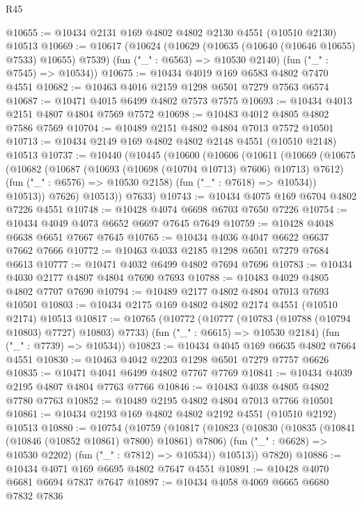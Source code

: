 \begin{lexlean}{R45}
\begin{coremodule}
@10655 := @10434 @2131 @169 @4802 @4802 @2130 @4551 (@10510 @2130) @10513
@10669 := @10617
    (@10624
      (@10629 (@10635 (@10640 (@10646 @10655) @7533) @10655) @7539)
      (fun ("_" : @6563) => @10530 @2140)
      (fun ("_" : @7545) => @10534))
@10675 := @10434 @4019 @169 @6583 @4802 @7470 @4551
@10682 := @10463 @4016 @2159 @1298 @6501 @7279 @7563 @6574
@10687 := @10471 @4015 @6499 @4802 @7573 @7575
@10693 := @10434 @4013 @2151 @4807 @4804 @7569 @7572
@10698 := @10483 @4012 @4805 @4802 @7586 @7569
@10704 := @10489 @2151 @4802 @4804 @7013 @7572 @10501
@10713 := @10434 @2149 @169 @4802 @4802 @2148 @4551 (@10510 @2148) @10513
@10737 := @10440
    (@10445
      (@10600
        (@10606
          (@10611
            (@10669
              (@10675
                (@10682
                  (@10687 (@10693 (@10698 (@10704 @10713) @7606) @10713) @7612)
                  (fun ("_" : @6576) => @10530 @2158)
                  (fun ("_" : @7618) => @10534))
                @10513))
            @7626)
          @10513))
      @7633)
@10743 := @10434 @4075 @169 @6704 @4802 @7226 @4551
@10748 := @10428 @4074 @6698 @6703 @7650 @7226
@10754 := @10434 @4049 @4073 @6652 @6697 @7645 @7649
@10759 := @10428 @4048 @6638 @6651 @7667 @7645
@10765 := @10434 @4036 @4047 @6622 @6637 @7662 @7666
@10772 := @10463 @4033 @2185 @1298 @6501 @7279 @7684 @6613
@10777 := @10471 @4032 @6499 @4802 @7694 @7696
@10783 := @10434 @4030 @2177 @4807 @4804 @7690 @7693
@10788 := @10483 @4029 @4805 @4802 @7707 @7690
@10794 := @10489 @2177 @4802 @4804 @7013 @7693 @10501
@10803 := @10434 @2175 @169 @4802 @4802 @2174 @4551 (@10510 @2174) @10513
@10817 := @10765
    (@10772
      (@10777 (@10783 (@10788 (@10794 @10803) @7727) @10803) @7733)
      (fun ("_" : @6615) => @10530 @2184)
      (fun ("_" : @7739) => @10534))
@10823 := @10434 @4045 @169 @6635 @4802 @7664 @4551
@10830 := @10463 @4042 @2203 @1298 @6501 @7279 @7757 @6626
@10835 := @10471 @4041 @6499 @4802 @7767 @7769
@10841 := @10434 @4039 @2195 @4807 @4804 @7763 @7766
@10846 := @10483 @4038 @4805 @4802 @7780 @7763
@10852 := @10489 @2195 @4802 @4804 @7013 @7766 @10501
@10861 := @10434 @2193 @169 @4802 @4802 @2192 @4551 (@10510 @2192) @10513
@10880 := @10754
    (@10759
      (@10817
        (@10823
          (@10830
            (@10835 (@10841 (@10846 (@10852 @10861) @7800) @10861) @7806)
            (fun ("_" : @6628) => @10530 @2202)
            (fun ("_" : @7812) => @10534))
          @10513))
      @7820)
@10886 := @10434 @4071 @169 @6695 @4802 @7647 @4551
@10891 := @10428 @4070 @6681 @6694 @7837 @7647
@10897 := @10434 @4058 @4069 @6665 @6680 @7832 @7836

\end{coremodule}
\end{lexlean}
